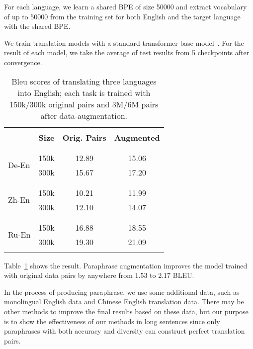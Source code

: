 For each language, we learn a shared BPE of size 50000 
and extract vocabulary of up to 
50000 from the training set for both English and the target language 
with the shared BPE. 

We train translation models with a standard 
transformer-base model~\cite{vaswani2017attention}. 
For the result of each model, we take the average of test results from 5 checkpoints after convergence.

\begin{table}
\centering
\small
\begin{tabular}{p{1cm}ccc}
\hline
\\ [-1.8ex]
& \textbf{Size} & \textbf{Orig. Pairs} & \textbf{Augmented} \\
\\ [-1.8ex]
\cline{2-4} 
\\ [-1.8ex]
\multirow{2}{1cm}{De-En} & 150k & 12.89 & 15.06 \\
& 300k & 15.67 & 17.20 \\
\\ [-1.8ex]
\hline
\\ [-1.8ex]
\multirow{2}{1cm}{Zh-En} & 150k & 10.21 & 11.99 \\
& 300k & 12.10 & 14.07 \\
\\ [-1.8ex]
\hline
\\ [-1.8ex]
\multirow{2}{1cm}{Ru-En} & 150k & 16.88 & 18.55 \\
& 300k & 19.30 & 21.09 \\
\\ [-1.8ex]
\hline
\end{tabular}
\caption{\label{tab:augment}
Bleu scores of translating three languages into English; 
each task is trained with 150k/300k original pairs 
and 3M/6M pairs after data-augmentation.}
\end{table}

Table~\ref{tab:augment} shows the result. 
Paraphrase augmentation improves the model trained with original data pairs 
by anywhere from 1.53 to 2.17 BLEU. 

In the process of producing paraphrase, we use some additional data, such as monolingual English data and Chinese English translation data. There may be other methods to improve the final results based on these data, but our purpose is to show the effectiveness of our methods in long sentences since only paraphrases with both accuracy and diversity can construct perfect translation pairs.

